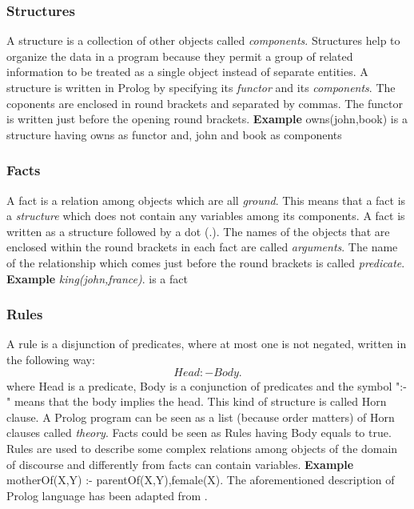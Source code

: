 \subsubsection{Structures}\label{subsubsec:structure}
A structure is a collection of other objects called \textit{components}. Structures help to organize the data in a program because
they permit a group of related information to be treated as a single object instead of separate entities.
A structure is written in Prolog by specifying its \textit{functor} and its \textit{components}. The coponents are enclosed in round brackets
and separated by commas. The functor is written just before the opening round brackets.\newline\newline
\textbf{Example}\newline\newline
owns(john,book) is a structure having owns as functor and, john and book as components
\subsubsection{Facts}\label{subsubsec:facts}
A fact is a relation among objects which are all \textit{ground}. This means that a fact is a \textit{structure} which does not contain any variables among its components.
A fact is written as a structure followed by a dot (.). The names of the objects that are enclosed within the round brackets in each fact are called \textit{arguments}.
The name of the relationship which comes just before the round brackets is called \textit{predicate}.\newline\newline
\textbf{Example}\newline\newline
\textit{king(john,france)}. is a fact

\subsubsection{Rules}\label{subsubsec:rules}
A rule is a disjunction of predicates, where at most one is not negated, written in the following way:
\[ Head :- Body.\]
where Head is a predicate, Body is a conjunction of predicates and the symbol ":-" means that the body implies the head. This kind of structure is called Horn clause.
A Prolog program can be seen as a list (because order matters) of Horn clauses called \textit{theory}.
Facts could be seen as Rules having Body equals to true.
Rules are used to describe some complex relations among objects of the domain of discourse and differently from facts can contain variables.\newline\newline
\textbf{Example}\newline\newline
motherOf(X,Y) :- parentOf(X,Y),female(X).\newline\newline
The aforementioned description of Prolog language has been adapted from \cite{Clocksin1987ProgrammingIP}.

